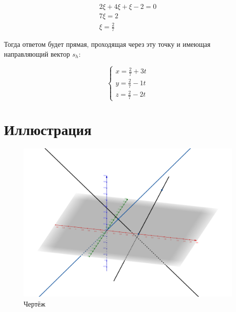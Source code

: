 \documentclass[12pt, a4paper]{article}
\begin{document}
    \begin{gather}
            2\xi + 4\xi + \xi − 2 = 0 \\
            7\xi = 2 \\
            \xi = \frac{2}{7}
    \end{gather}

    Тогда ответом будет прямая, проходящая через эту точку и имеющая направляющий вектор $s_h$:

    \begin{equation}
        \begin{cases}
            x = \frac{2}{7} + 3t \\
            y = \frac{2}{7} - 1t\\
            z = \frac{2}{7} - 2t
        \end{cases}
    \end{equation}


    \section{Иллюстрация}
    
    \begin{figure}
        \centering
        \includegraphics[width=\paperwidth]{resources/1.5_figure.png}
        \caption{Чертёж}
        \label{fig:main_figure}
    \end{figure}
    \FloatBarrier
\end{document}
